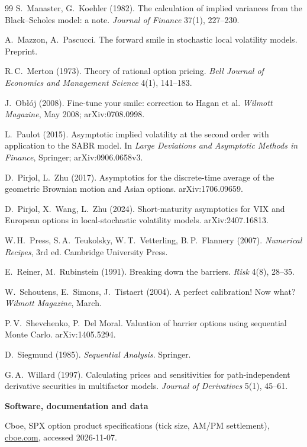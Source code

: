 \begin{thebibliography}{99}
S.~Manaster, G.~Koehler (1982).
The calculation of implied variances from the Black--Scholes model: a note.
\emph{Journal of Finance} 37(1), 227--230.

A.~Mazzon, A.~Pascucci.
The forward smile in stochastic local volatility models.
Preprint.

R.\,C.~Merton (1973).
Theory of rational option pricing.
\emph{Bell Journal of Economics and Management Science} 4(1), 141--183.

J.~Ob{\l}{\'o}j (2008).
Fine-tune your smile: correction to Hagan et al.
\emph{Wilmott Magazine}, May 2008; arXiv:0708.0998.

L.~Paulot (2015).
Asymptotic implied volatility at the second order with application to the SABR model.
In \emph{Large Deviations and Asymptotic Methods in Finance}, Springer; arXiv:0906.0658v3.

D.~Pirjol, L.~Zhu (2017).
Asymptotics for the discrete-time average of the geometric Brownian motion and Asian options.
arXiv:1706.09659.

D.~Pirjol, X.~Wang, L.~Zhu (2024).
Short-maturity asymptotics for VIX and European options in local-stochastic volatility models.
arXiv:2407.16813.

W.\,H.~Press, S.\,A.~Teukolsky, W.\,T.~Vetterling, B.\,P.~Flannery (2007).
\emph{Numerical Recipes}, 3rd ed.
Cambridge University Press.

E.~Reiner, M.~Rubinstein (1991).
Breaking down the barriers.
\emph{Risk} 4(8), 28--35.

W.~Schoutens, E.~Simons, J.~Tistaert (2004).
A perfect calibration! Now what?
\emph{Wilmott Magazine}, March.

P.\,V.~Shevchenko, P.~Del Moral.
Valuation of barrier options using sequential Monte Carlo.
arXiv:1405.5294.

D.~Siegmund (1985).
\emph{Sequential Analysis}.
Springer.

G.\,A.~Willard (1997).
Calculating prices and sensitivities for path-independent derivative securities in multifactor models.
\emph{Journal of Derivatives} 5(1), 45--61.

\item[]\medskip\textbf{Software, documentation and data}

Cboe, SPX option product specifications (tick size, AM/PM settlement), \url{cboe.com}, accessed 2026-11-07.


\end{thebibliography}
